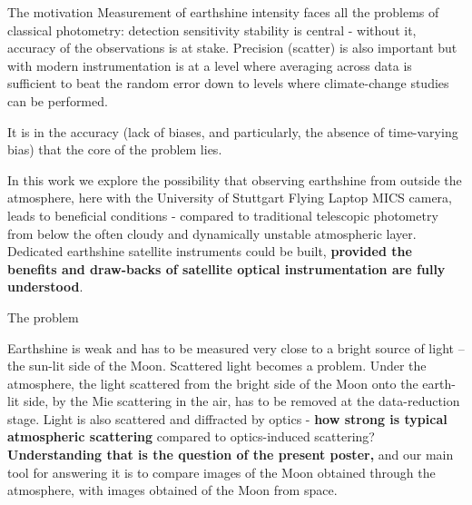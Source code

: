 \documentclass[final,hyperref={pdfpagelabels=false}]{beamer}
\begin{document}
\begin{frame}[t]
\begin{columns}[t]
\begin{column}{.23\textwidth}
\begin{block}{The motivation}
Measurement of earthshine intensity faces all the problems of classical photometry: detection sensitivity  stability is central - without it, accuracy of the observations is at stake. Precision (scatter) is also important but with modern instrumentation is at a level where averaging across data is sufficient to beat the random error down to levels where climate-change studies can be performed.

It is in the accuracy (lack of biases, and particularly, the absence of time-varying bias) that the core of the problem lies.

In this work we explore the possibility that observing earthshine from outside the atmosphere, here with the University of Stuttgart Flying Laptop MICS camera, leads to beneficial conditions - compared to traditional telescopic photometry from below the often cloudy and dynamically unstable  atmospheric layer. Dedicated earthshine satellite instruments could be built, \textbf{provided the benefits and draw-backs of satellite optical instrumentation are fully understood}.




\end{block}


            
\begin{block}{The problem}
 
Earthshine is weak and has to be measured very close to a bright source of light -- the sun-lit side of the Moon. Scattered light becomes a problem. Under the atmosphere, the light scattered from the bright side of the Moon onto the earth-lit side, by the Mie scattering in the air, has to be removed at the data-reduction stage. Light is also scattered and diffracted by optics - \textbf{how strong is typical atmospheric scattering} compared to optics-induced scattering? \textbf{Understanding that is the question of the present poster,} and our main tool for answering it is to compare images of the Moon obtained through the atmosphere, with images obtained of the Moon from space.
\end{block}


\end{column}
\end{columns}
\end{frame}
\end{document}

